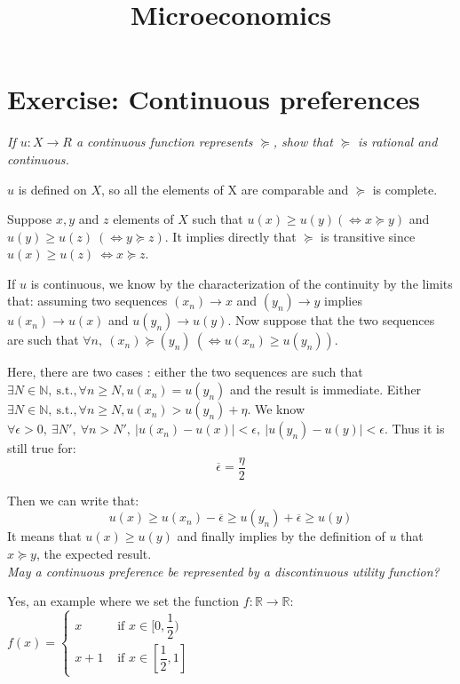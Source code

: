\documentclass[11pt]{article} %
\title{Microeconomics }
\begin{document}
\maketitle


\section*{Exercise: Continuous preferences }

\textit{If $u : X \rightarrow R$ a continuous function represents $\succeq$, show that $\succeq$ is rational and continuous. }

$u$ is defined on $X$, so all the elements of X are comparable and $\succeq$ is complete.

Suppose $ x,y$ and $z$ elements of $X$ such that $u(x) \geq u(y) (\Leftrightarrow x \succeq y) $ and $u(y) \geq u(z) \ (\Leftrightarrow y \succeq z) $. It implies directly that $\succeq$ is transitive since $u(x) \geq u(z) \ \Leftrightarrow x \succeq z $.

If $u$ is continuous, we know by the characterization of the continuity by the limits that: assuming two sequences $(x_n) \rightarrow x $ and $(y_n) \rightarrow y $ implies $u(x_n) \rightarrow u(x) $ and $u(y_n) \rightarrow u(y) $. Now suppose that the two sequences are such that $\forall n, \  (x_n) \succeq (y_n) \ (\Leftrightarrow u(x_n) \geq u(y_n))$.



Here, there are two cases : either the two sequences are such that $\exists N \in \mathbb{N}, \ \mathrm{s.t.}, \forall n \geq N, u(x_n) = u(y_n) $ and the result is immediate. Either  $\exists N \in \mathbb{N}, \ \mathrm{s.t.}, \forall n \geq N, u(x_n) > u(y_n) + \eta $. We know $\forall \epsilon > 0, \ \exists N', \ \forall n >  N',  \ \vert u(x_n) - u(x) \vert < \epsilon,  \ \vert u(y_n) - u(y) \vert < \epsilon $.
Thus it is still true for: 
\[
\overline{ \epsilon } =  \dfrac{\eta}{ 2}
\]

Then we can write that: $$ u(x) \geq u(x_n) - \overline{ \epsilon } \geq u(y_n) + \overline{ \epsilon } \geq u(y)  $$
It means that $u(x) \geq u(y) $ and finally implies by the definition of $u$ that $x \succeq y $, the expected result.\\


\textit{May a continuous preference be represented by a discontinuous utility function?}

Yes, an example where we set the function $f : \mathbb{R} \rightarrow \mathbb{R} $: 
$f(x) = \begin{cases}
x&\mbox{ if } x \in [0, \dfrac{1}{2}) \\
x+1&\mbox{ if }x \in [\dfrac{1}{2}, 1]
\end{cases} $ 
\end{document}
